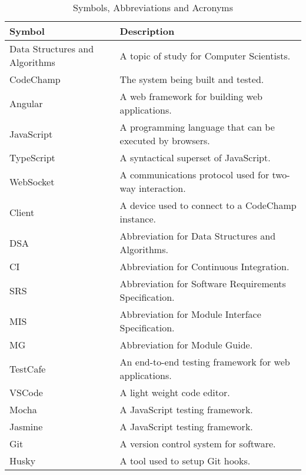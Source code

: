 \documentclass[12pt, titlepage]{article}
\begin{document}
\begin{table}[H]
\begin{center}
\begin{tabular}{|p{3cm}|p{9cm}|}
\hline
  \textbf{Symbol} & \textbf{Description}\\
  \hline
  Data Structures and Algorithms & A topic of study for Computer Scientists.\\
  \hline
  CodeChamp & The system being built and tested.\\
  \hline
  Angular & A web framework for building web applications.\\
  \hline
  JavaScript & A programming language that can be executed by browsers.\\
  \hline
  TypeScript & A syntactical superset of JavaScript.\\
  \hline
  WebSocket & A communications protocol used for two-way interaction.\\
  \hline
  Client & A device used to connect to a CodeChamp instance.\\
  \hline
  DSA & Abbreviation for Data Structures and Algorithms.\\
  \hline
  CI & Abbreviation for Continuous Integration.\\
  \hline
  SRS & Abbreviation for Software Requirements Specification.\\
  \hline
  MIS & Abbreviation for Module Interface Specification.\\
  \hline
  MG & Abbreviation for Module Guide.\\
  \hline
  TestCafe & An end-to-end testing framework for web applications. \\
  \hline
  VSCode & A light weight code editor.\\
  \hline
  Mocha & A JavaScript testing framework.\\
  \hline
  Jasmine &  A JavaScript testing framework.\\
  \hline
  Git & A version control system for software.\\
  \hline
  Husky & A tool used to setup Git hooks.\\
  \hline
\end{tabular}
\end{center}
\caption{Symbols, Abbreviations and Acronyms}            

\end{table}

\newpage

\end{document}
